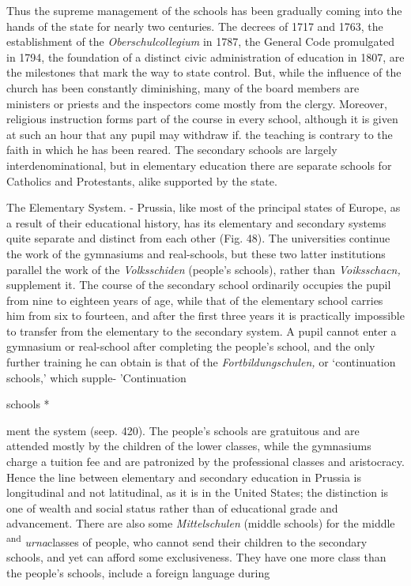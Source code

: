 \documentclass[
]{book}
\begin{document}
Thus the supreme management of the schools has been gradually coming into the hands of the state for nearly two centuries. The decrees of 1717 and 1763, the establishment of the \emph{Oberschulcollegium} in 1787, the General Code promulgated in 1794, the foundation of a distinct civic administration of education in 1807, are the milestones that mark the way to state control. But, while the influence of the church has been constantly diminishing, many of the board members are ministers or priests and the inspectors come mostly from the clergy. Moreover, religious instruction forms part of the course in every school, although it is given at such an hour that any pupil may withdraw if. the teaching is contrary to the faith in which he has been reared. The secondary schools are largely interdenominational, but in elementary education there are separate schools\protect\hypertarget{ch25.xmlux5cux23para.452.1.0.box.111.220.1047.88.q.70}{}{ for Catholics and Protestants, alike supported by the state.}

The Elementary System. - Prussia, like most of the principal states of Europe, as a result of their educational history, has its elementary and secondary systems quite separate and distinct from each other (Fig. 48). The universities continue the work of the gymnasiums and real-schools, but these two latter institutions parallel the work of the \emph{Volksschiden} (people's schools), rather than \emph{Voiksschacn,} supplement it. The course of the secondary school ordinarily occupies the pupil from nine to eighteen years of age, while that of the elementary school carries him from six to fourteen, and after the first three years it is practically impossible to transfer from the elementary to the secondary system. A pupil cannot enter a gymnasium or real-school after completing the people's school, and the only further training he can obtain is that of the \emph{Fortbildungschulen,} or `continuation schools,' which supple- 'Continuation

schools *

ment the system (seep. 420). The people's schools are gratuitous and are attended mostly by the children of the lower classes, while the gymnasiums charge a tuition fee and are patronized by the professional classes and aristocracy. Hence the line between elementary and secondary education in Prussia is longitudinal and not latitudinal, as it is in the United States; the distinction is one of wealth and social status rather than of educational grade and advancement. There are also some \emph{Mittelschulen} (middle schools) for the middle \textsuperscript{and} \emph{urna}classes of people, who cannot send their children to the secondary schools, and yet can afford some exclusiveness. They have one more class than the people's schools, include a foreign language during
\end{document}
